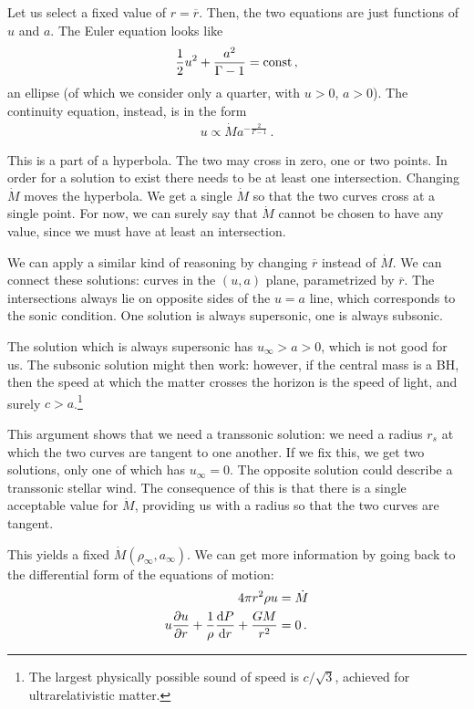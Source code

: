 \documentclass[main.tex]{subfiles}
\begin{document}
Let us select a fixed value of \(r = \overline{r}\). Then, the two equations are just functions of \(u\) and \(a\). The Euler equation looks like 
%
\begin{align}
\frac{1}{2} u^2 + \frac{a^2}{\Gamma -1} = \text{const}
\,,
\end{align}
%
an ellipse (of which we consider only a quarter, with \(u>0\), \(a>0\)). 
The continuity equation, instead, is in the form 
%
\begin{align}
u \propto  \dot{M} a^{- \frac{2}{\Gamma -1}}
\,.
\end{align}

This is a part of a hyperbola. The two may cross in zero, one or two points. In order for a solution to exist there needs to be at least one intersection. 
Changing \(\dot{M}\) moves the hyperbola. We get a single \(\dot{M}\) so that the two curves cross at a single point.
For now, we can surely say that \(\dot{M}\) cannot be chosen to have any value, since we must have at least an intersection. 

We can apply a similar kind of reasoning by changing \(\overline{r}\) instead of \(\dot{M}\). 
We can connect these solutions: curves in the \((u, a)\) plane, parametrized by \(\overline{r}\). 
The intersections always lie on opposite sides of the \(u = a\) line, which corresponds to the sonic condition. 
One solution is always supersonic, one is always subsonic. 

The solution which is always supersonic has \(u_\infty > a > 0\), which is not good for us. 
The subsonic solution might then work: however, if the central mass is a BH, then the speed at which the matter crosses the horizon is the speed of light, and surely \(c > a\).\footnote{The largest physically possible sound of speed is \(c / \sqrt{3}\), achieved for ultrarelativistic matter.}

This argument shows that we need a transsonic solution: we need a radius \(r_s\) at which the two curves are tangent to one another. 
If we fix this, we get two solutions, only one of which has \(u_\infty = 0\). 
The opposite solution could describe a transsonic stellar wind. 
The consequence of this is that there is a single acceptable value for \(\dot{M}\), providing us with a radius so that the two curves are tangent. 

This yields a fixed \(\dot{M} (\rho _\infty , a_\infty )\). 
We can get more information by going back to the differential form of the equations of motion: 
%
\begin{align}
4 \pi r^2 \rho u &= \dot{M}  \\
u \pdv{u}{r} + \frac{1}{\rho } \dv{P}{r} + \frac{GM}{r^2} &= 0
\,.
\end{align}
\end{document}
